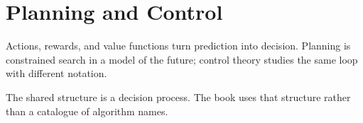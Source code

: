 \chapter{Planning and Control}
\label{ch:planning}

Actions, rewards, and value functions turn prediction into decision. Planning is constrained search in a model of the future; control theory studies the same loop with different notation.

The shared structure is a decision process. The book uses that structure rather than a catalogue of algorithm names.
